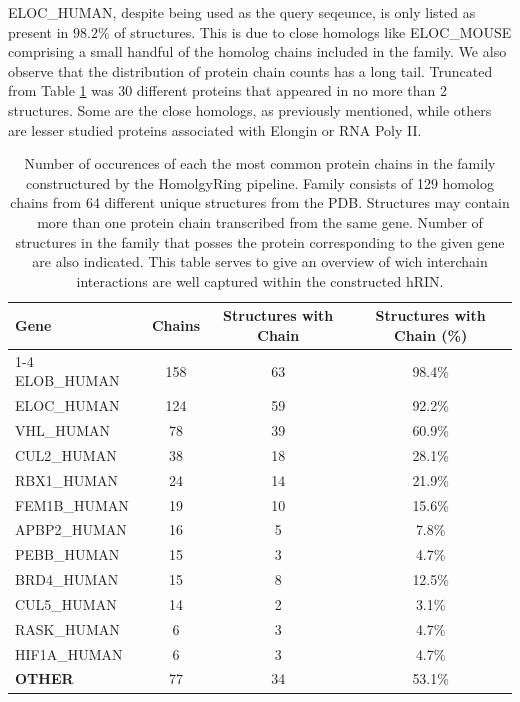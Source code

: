 ELOC\_HUMAN, despite being used as the query seqeunce, is only listed as present in $98.2\%$ of structures. This is due to close homologs like ELOC\_MOUSE comprising a small handful of the homolog chains included in the family.  
We also observe that the distribution of protein chain counts has a long tail. Truncated from Table \ref{tab:eloc-chain-count} was 30 different proteins that appeared in no more than 2 structures. Some are the close homologs, as previously mentioned, while others are lesser studied proteins associated with Elongin or RNA Poly II. 

\begin{table}[h!] %
    \centering
    \begin{tabular}{l c c c}
    \textbf{Gene} & \textbf{Chains} & \textbf{Structures with Chain} &  \textbf{Structures with Chain (\%)} \\ \cline{1-4}
ELOB\_HUMAN & 158 & 63 & 98.4\% \\
ELOC\_HUMAN & 124 & 59 & 92.2\% \\
VHL\_HUMAN & 78 & 39 & 60.9\% \\
CUL2\_HUMAN & 38 & 18 & 28.1\% \\
RBX1\_HUMAN & 24 & 14 & 21.9\% \\
FEM1B\_HUMAN & 19 & 10 & 15.6\% \\
APBP2\_HUMAN & 16 & 5 & 7.8\% \\
PEBB\_HUMAN & 15 & 3 & 4.7\% \\
BRD4\_HUMAN & 15 & 8 & 12.5\% \\
CUL5\_HUMAN & 14 & 2 & 3.1\% \\
RASK\_HUMAN & 6 & 3 & 4.7\% \\
HIF1A\_HUMAN & 6 & 3 & 4.7\% \\
\textbf{OTHER} & 77 & 34 & 53.1\% \\
    \end{tabular}
    \caption{Number of occurences of each the most common protein chains in the family constructured by the HomolgyRing pipeline. Family consists of 129 homolog chains from 64 different unique structures from the PDB. Structures may contain more than one protein chain transcribed from the same gene. Number of structures in the family that posses the protein corresponding to the given gene are also indicated. This table serves to give an overview of wich interchain interactions are well captured within the constructed hRIN.}
    \label{tab:eloc-chain-count}
\end{table}

